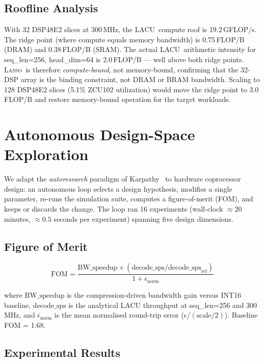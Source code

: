 \documentclass[conference]{IEEEtran}
\newcommand{\lasso}{\textsc{Lasso}}
\newcommand{\lacu}{\textsc{LACU}}
\begin{document}
\subsection{Roofline Analysis}

With 32 DSP48E2 slices at 300\,MHz, the \lacu\ compute roof is
19.2\,GFLOP/s.  The ridge point (where compute equals memory
bandwidth) is 0.75\,FLOP/B (DRAM) and 0.38\,FLOP/B (SRAM).  The
actual \lacu\ arithmetic intensity for seq\_len=256, head\_dim=64 is
2.0\,FLOP/B --- well above both ridge points.  \lasso\ is therefore
\emph{compute-bound}, not memory-bound, confirming that the 32-DSP
array is the binding constraint, not DRAM or BRAM bandwidth.  Scaling
to 128 DSP48E2 slices (5.1\% ZCU102 utilization) would move the ridge
point to 3.0\,FLOP/B and restore memory-bound operation for the
target workloads.

\section{Autonomous Design-Space Exploration}
\label{sec:dse}

We adapt the \emph{autoresearch} paradigm of Karpathy~\cite{autoresearch2026}
to hardware coprocessor design: an autonomous loop selects a design
hypothesis, modifies a single parameter, re-runs the simulation suite,
computes a figure-of-merit (FOM), and keeps or discards the change.
The loop ran 16 experiments (wall-clock ${\approx}20$ minutes, ${\approx}0.5$
seconds per experiment) spanning five design dimensions.

\subsection{Figure of Merit}

\[
  \text{FOM} = \frac{\text{BW\_speedup} \times (\text{decode\_sps} /
  \text{decode\_sps}_\text{ref})}{1 + \overline{\epsilon}_\text{norm}}
\]

where $\text{BW\_speedup}$ is the compression-driven bandwidth gain
versus INT16 baseline, $\text{decode\_sps}$ is the analytical LACU
throughput at seq\_len=256 and 300\,MHz, and $\overline{\epsilon}_\text{norm}$
is the mean normalised round-trip error ($\epsilon / (\text{scale}/2)$).
Baseline FOM = 1.68.

\subsection{Experimental Results}
\end{document}
